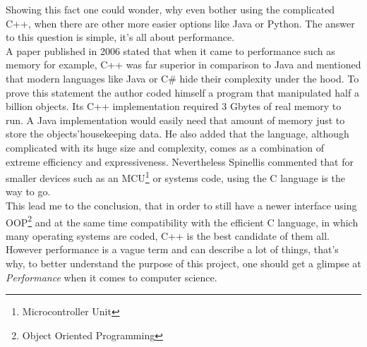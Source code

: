 Showing this fact one could wonder, why even bother using the complicated C++, when there are other more easier options like Java or Python. The answer to this question is simple, it's all about performance.\\
A paper published in 2006 stated that when it came to performance such as memory for example, C++ was far superior in comparison to Java and mentioned that modern languages like Java or C\# hide their complexity under the hood. To prove this statement the author coded himself \dq a program that manipulated half a billion objects. Its C++ implementation required 3 Gbytes of real memory to run. A Java implementation would easily need that amount of memory just to store the objects'housekeeping data\dq{}. He also added that the language, although complicated with its huge size and complexity, comes as a combination of \dq extreme efficiency and expressiveness\dq{}. Nevertheless Spinellis commented that for smaller devices such as an MCU\footnote{Microcontroller Unit} or systems code, using the C language is the way to go\cite{1657941}.\\
This lead me to the conclusion, that in order to still have a newer interface using OOP\footnote{Object Oriented Programming} and at the same time compatibility with the efficient C language, in which many operating systems are coded, C++ is the best candidate of them all. However performance is a vague term and can describe a lot of things, that's why, to better understand the purpose of this project, one should get a glimpse at \textit{Performance} when it comes to computer science. 
